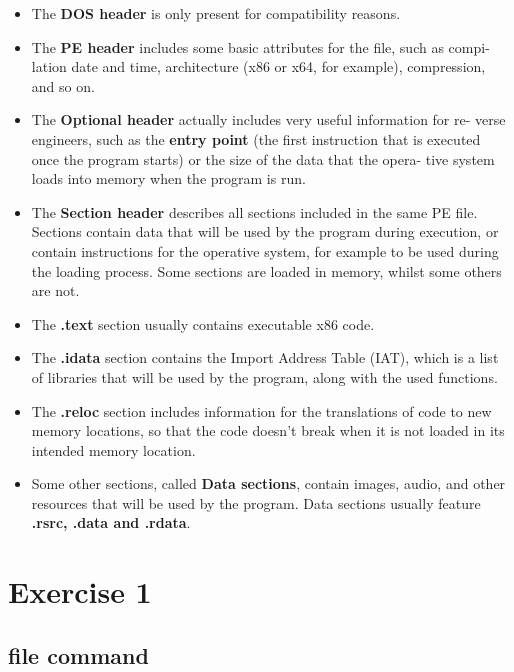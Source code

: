 \documentclass[]{project_plan}
\begin{document}
\newpage

\begin{itemize}
  \item The \textbf{DOS header} is only present for compatibility reasons.
  \item The \textbf{PE header} includes some basic attributes for the file, such as compi-
        lation date and time, architecture (x86 or x64, for example), compression,
        and so on.
  \item The \textbf{Optional header} actually includes very useful information for re-
        verse engineers, such as the \textbf{entry point} (the first instruction that is
        executed once the program starts) or the size of the data that the opera-
        tive system loads into memory when the program is run.
  \item The \textbf{Section header} describes all sections included in the same PE file.
        Sections contain data that will be used by the program during execution,
        or contain instructions for the operative system, for example to be used
        during the loading process. Some sections are loaded in memory, whilst
        some others are not.
  \item The \textbf{.text} section usually contains executable x86 code.
  \item The \textbf{.idata} section contains the Import Address Table (IAT), which is
        a list of libraries that will be used by the program, along with the used
        functions.
  \item The \textbf{.reloc} section includes information for the translations of code to
        new memory locations, so that the code doesn’t break when it is not loaded
        in its intended memory location.
  \item Some other sections, called \textbf{Data sections}, contain images, audio, and
        other resources that will be used by the program. Data sections usually
        feature \textbf{.rsrc, .data and .rdata}.
\end{itemize}

\section{Exercise 1}

\subsection{file command}
\end{document}
